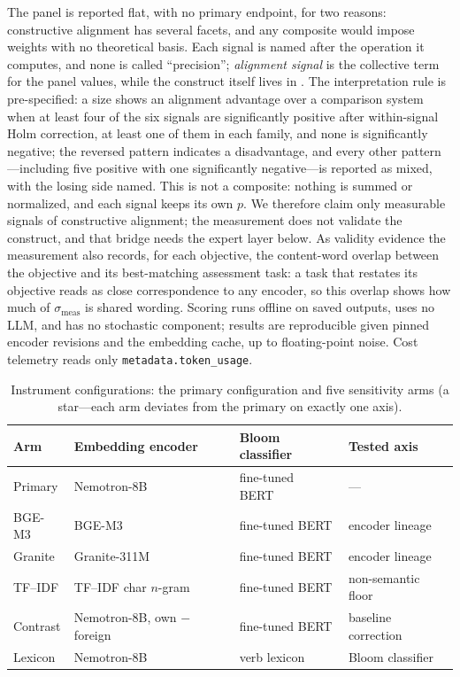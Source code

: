 The panel is reported flat, with no primary endpoint, for two reasons: constructive
alignment has several facets, and any composite would impose weights with no
theoretical basis. Each signal is named after the operation it computes, and none is
called ``precision''; \emph{alignment signal} is the collective term for the panel
values, while the construct itself lives in . The interpretation
rule is pre-specified: a size shows an alignment advantage over a comparison system
when at least four of the six signals are significantly positive after within-signal
Holm correction, at least one of them in each family, and none is significantly
negative; the reversed pattern indicates a
disadvantage, and every other pattern---including five positive with one
significantly negative---is reported as mixed, with the losing side named. This is
not a composite: nothing is summed or normalized, and each signal keeps its own $p$.
We therefore claim only measurable signals of constructive alignment; the
measurement does not validate the construct, and that bridge needs the expert layer
below. As validity evidence the measurement also records, for each objective, the
content-word overlap between the objective and its best-matching assessment task: a
task that restates its objective reads as close correspondence to any encoder, so
this overlap shows how much of $\sigma_{\mathrm{meas}}$ is shared wording. Scoring runs offline on saved outputs, uses no LLM, and has no stochastic
component; results are reproducible given pinned encoder revisions and the embedding
cache, up to floating-point noise. Cost telemetry reads only
\texttt{metadata.token\_usage}.

\begin{table}[t]
  \caption{Instrument configurations: the primary configuration and five sensitivity
  arms (a star---each arm deviates from the primary on exactly one axis).}
  \label{tab:rq2-arms}
  \small
  \begin{tabular}{@{}lllp{}@{}}
    \toprule
    Arm & Embedding encoder & Bloom classifier & Tested axis \\
    \midrule
    Primary & Nemotron-8B~\cite{babakhin2025nemotron} &
    fine-tuned BERT~\cite{li2022bloomclassification,faraji2026crossdataset} & --- \\
    BGE-M3 & BGE-M3~\cite{chen2024m3embedding} & fine-tuned BERT & encoder lineage \\
    Granite & Granite-311M~\cite{awasthy2026granite} & fine-tuned BERT & encoder lineage \\
    TF--IDF & TF--IDF char $n$-gram & fine-tuned BERT & non-semantic floor \\
    Contrast & Nemotron-8B, own $-$ foreign & fine-tuned BERT & baseline correction \\
    Lexicon & Nemotron-8B & verb lexicon~\cite{anderson2001taxonomy} &
    Bloom classifier \\
    \bottomrule
  \end{tabular}
\end{table}

